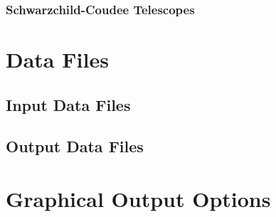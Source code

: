 \documentclass{article}
\begin{document}
\subsubsection{Schwarzchild-Coudee Telescopes}\label{SSS:SCTEL}

\section{Data Files}\label{S:DATAF}
\subsection{Input Data Files}\label{SS:INDATA}


\subsection {Output Data Files}\label{SS:ODATA}

\section{Graphical Output Options}\label{S:GRAPH}
\end{document}
